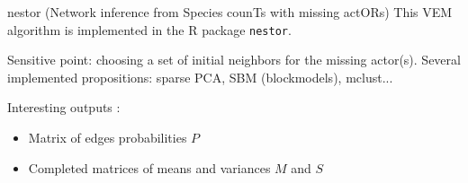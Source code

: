 \documentclass[11pt]{beamer}
\newcommand{\emphase}[1]{\textcolor{Complement}{#1}}
\newcommand{\bleu}[1]{\textcolor{Framableulight}{#1}}
\begin{document}
     \begin{frame}{nestor (Network inference from Species counTs with missing actORs)}
     This VEM algorithm is implemented in the R package \texttt{nestor}.\\
     \bigskip
     
     \bleu{ Sensitive point:} choosing a set of \emphase{initial neighbors} for the missing actor(s). Several implemented propositions: sparse PCA, SBM (blockmodels), mclust...\\
     \bigskip
     
     \bleu{Interesting outputs :}
     \begin{itemize}
     \item Matrix of edges probabilities $P$
     \item Completed matrices of means and variances $M$ and $S$
     \end{itemize}
     
    
     \end{frame}
\end{document}
